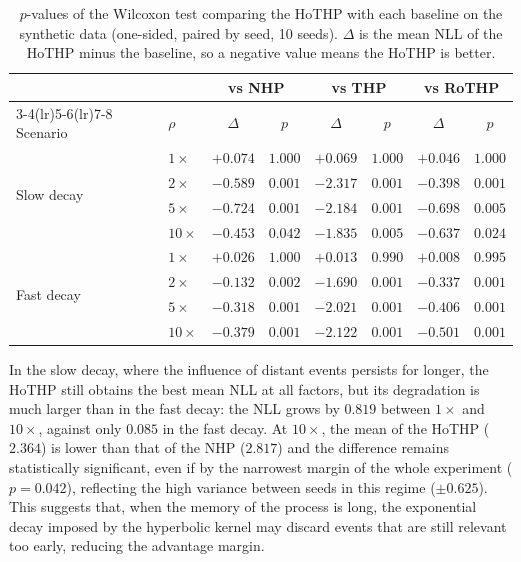 \begin{table}[h!]
\centering
\caption{$p$-values of the Wilcoxon test comparing the HoTHP with each baseline on the synthetic data (one-sided, paired by seed, 10 seeds). $\Delta$ is the mean NLL of the HoTHP minus the baseline, so a negative value means the HoTHP is better.}
\label{tab:pvalues-sinteticos}
\begin{tabular}{llcccccc}
\toprule
 & & \multicolumn{2}{c}{vs NHP} & \multicolumn{2}{c}{vs THP} & \multicolumn{2}{c}{vs RoTHP} \\
\cmidrule(lr){3-4}\cmidrule(lr){5-6}\cmidrule(lr){7-8}
Scenario & $\rho$ & $\Delta$ & $p$ & $\Delta$ & $p$ & $\Delta$ & $p$ \\
\midrule
\multirow{4}{*}{Slow decay}
    & $1\times$  & $+0.074$ & $1.000$      & $+0.069$ & $1.000$      & $+0.046$ & $1.000$ \\
    & $2\times$  & $-0.589$ & $0.001$  & $-2.317$ & $0.001$  & $-0.398$ & $0.001$ \\
    & $5\times$  & $-0.724$ & $0.001$  & $-2.184$ & $0.001$  & $-0.698$ & $0.005$ \\
    & $10\times$ & $-0.453$ & $0.042$  & $-1.835$ & $0.005$  & $-0.637$ & $0.024$ \\
\midrule
\multirow{4}{*}{Fast decay}
    & $1\times$  & $+0.026$ & $1.000$      & $+0.013$ & $0.990$      & $+0.008$ & $0.995$ \\
    & $2\times$  & $-0.132$ & $0.002$  & $-1.690$ & $0.001$  & $-0.337$ & $0.001$ \\
    & $5\times$  & $-0.318$ & $0.001$  & $-2.021$ & $0.001$  & $-0.406$ & $0.001$ \\
    & $10\times$ & $-0.379$ & $0.001$  & $-2.122$ & $0.001$  & $-0.501$ & $0.001$ \\
\bottomrule
\end{tabular}
\end{table}

In the slow decay, where the influence of distant events persists for longer, the HoTHP still obtains the best mean NLL at all factors, but its degradation is much larger than in the fast decay: the NLL grows by $0.819$ between $1\times$ and $10\times$, against only $0.085$ in the fast decay. At $10\times$, the mean of the HoTHP ($2.364$) is lower than that of the NHP ($2.817$) and the difference remains statistically significant, even if by the narrowest margin of the whole experiment ($p = 0.042$), reflecting the high variance between seeds in this regime ($\pm 0.625$). This suggests that, when the memory of the process is long, the exponential decay imposed by the hyperbolic kernel may discard events that are still relevant too early, reducing the advantage margin.

